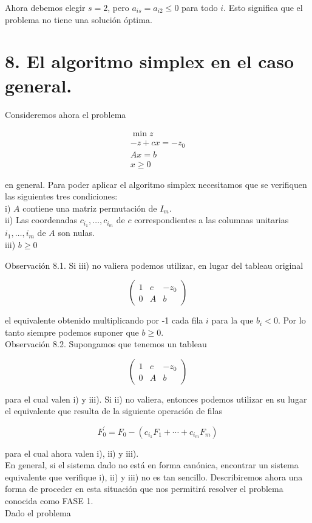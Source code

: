 \documentclass[10pt]{article}
\begin{document}
Ahora debemos elegir $s=2$, pero $a_{i s}=a_{i 2} \leq 0$ para todo $i$. Esto significa que el problema no tiene una solución óptima.

\section*{8. El algoritmo simplex en el caso general.}
Consideremos ahora el problema

$$
\begin{gathered}
\min z \\
-z+c x=-z_{0} \\
A x=b \\
x \geq 0
\end{gathered}
$$

en general. Para poder aplicar el algoritmo simplex necesitamos que se verifiquen las siguientes tres condiciones:\\
i) $A$ contiene una matriz permutación de $I_{m}$.\\
ii) Las coordenadas $c_{i_{1}}, \ldots, c_{i_{m}}$ de $c$ correspondientes a las columnas unitarias $i_{1}, \ldots, i_{m}$ de $A$ son nulas.\\
iii) $b \geq 0$

Observación 8.1. Si iii) no valiera podemos utilizar, en lugar del tableau original

$$
\left(\begin{array}{cc|c}
1 & c & -z_{0} \\
0 & A & b
\end{array}\right)
$$

el equivalente obtenido multiplicando por -1 cada fila $i$ para la que $b_{i}<0$. Por lo tanto siempre podemos suponer que $b \geq 0$.\\
Observación 8.2. Supongamos que tenemos un tableau

$$
\left(\begin{array}{cc|c}
1 & c & -z_{0} \\
0 & A & b
\end{array}\right)
$$

para el cual valen i) y iii). Si ii) no valiera, entonces podemos utilizar en su lugar el equivalente que resulta de la siguiente operación de filas

$$
F_{0}^{\prime}=F_{0}-\left(c_{i_{1}} F_{1}+\cdots+c_{i_{m}} F_{m}\right)
$$

para el cual ahora valen i), ii) y iii).\\
En general, si el sistema dado no está en forma canónica, encontrar un sistema equivalente que verifique i), ii) y iii) no es tan sencillo. Describiremos ahora una forma de proceder en esta situación que nos permitirá resolver el problema conocida como FASE 1.\\
Dado el problema
\end{document}
